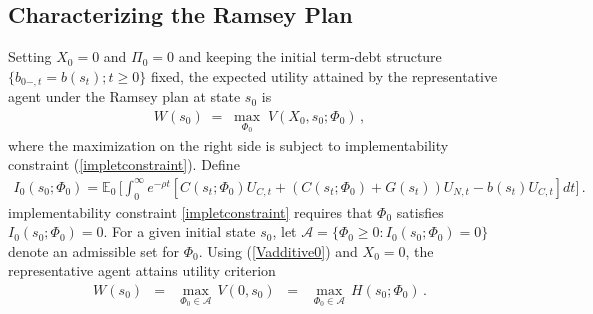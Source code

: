 \documentclass[12pt]{article}
\newcommand{\NW}[1]{{\textcolor{blue}{#1}}}
\newcommand{\WJ}[1]{{\textcolor{red}{#1}}}
\newcommand{\TS}[1]{{\textcolor{magenta}{#1}}}
\begin{document}
\subsection{Characterizing the Ramsey Plan} \label{sec:DPRamsey}

Setting $X_0=0$ and  $\Pi_0=0$ and keeping   the initial term-debt  structure $\{b_{0-, t}=b(s_t); t\geq 0\}$ fixed,
the  expected utility attained by the representative agent under the Ramsey plan at state $s_0$ is  %
\begin{eqnarray}\label{W}
	W(s_0) %
	\; = \; \max_{\Phi_{0}} \; V(X_{0}, s_0; \Phi_0)  \, ,
\end{eqnarray}
where the maximization on the right side is subject to implementability constraint (\ref{impletconstraint}). 
Define%
\begin{eqnarray}\label{eq:Psi0}
	I_0(s_0; \Phi_{0}) = \mathbb{E}_0 \, \bigg[ \int_{0}^{\infty} e^{-\rho t} \left[ C(s_t; \Phi_{0})U_{C, t}+(C(s_t; \Phi_{0})+G(s_t))U_{N, t} -b(s_t) U_{C, t}  \right]  dt  \bigg]  \, .%
\end{eqnarray}
implementability constraint \eqref{impletconstraint} requires that $\Phi_0$ satisfies $I_0(s_0; \Phi_{0}) =0$.
For a given initial state $s_0$, let $\mathcal A=\{\Phi_0\geq 0: I_0(s_0; \Phi_0)=0\}$ denote an admissible set for $\Phi_0$.
Using (\ref{Vadditive0}) and $X_0=0$, the representative agent attains utility criterion %
\begin{eqnarray}\label{WWW} 
	W(s_0)  & = & \max_{\Phi_0\in \mathcal A}\, V(0, s_0) \;\;
	= \;\; \max_{\Phi_0\in \mathcal A} \, H(s_0; \Phi_0)  \,.
\end{eqnarray}
\end{document}

